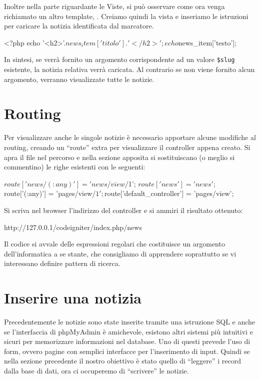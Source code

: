 Inoltre nella parte riguardante le Viste, si può osservare come ora venga richiamato un altro template, . Creiamo quindi la vista  e inseriamo le istruzioni per caricare la notizia identificata dal marcatore.

\begin{code}
<?php
echo '<h2>'.$news_item['titolo'].'</h2>';
echo $news_item['testo'];
\end{code}

In sintesi, se verrà fornito un argomento corrispondente ad un valore \verb|$slug| esistente, la notizia relativa verrà caricata. Al contrario se non viene fornito alcun argomento, verranno visualizzate tutte le notizie.

\section*{Routing}
Per visualizzare anche le singole notizie è necessario apportare alcune modifiche al routing, creando un ``route'' extra per visualizzare il controller appena creato. Si apra il file  nel percorso  e nella sezione apposita si sostituiscano (o meglio si commentino) le righe esistenti con le seguenti:

\begin{code}
$route['news/(:any)'] = 'news/view/$1';
$route['news'] = 'news';
$route['(:any)'] = 'pages/view/$1';
$route['default_controller'] = 'pages/view';
\end{code}

Si scriva nel browser l'indirizzo del controller e si ammiri il risultato ottenuto:

\begin{code}
http://127.0.0.1/codeigniter/index.php/news
\end{code}

Il codice si avvale delle espressioni regolari che costituisce un argomento dell'informatica a se stante, che consigliamo di apprendere soprattutto se vi interessano definire pattern di ricerca.

\section*{Inserire una notizia}
Precedentemente le notizie sono state inserite tramite una istruzione SQL e anche se l'interfaccia di phpMyAdmin è amichevole, esistono altri sistemi più intuitivi e sicuri per memorizzare informazioni nel database. Uno di questi prevede l'uso di form, ovvero pagine con semplici interfacce per l'inserimento di input. Quindi se nella sezione precedente il nostro obiettivo è stato quello di ``leggere'' i record dalla base di dati, ora ci occuperemo di ``scrivere'' le notizie.

